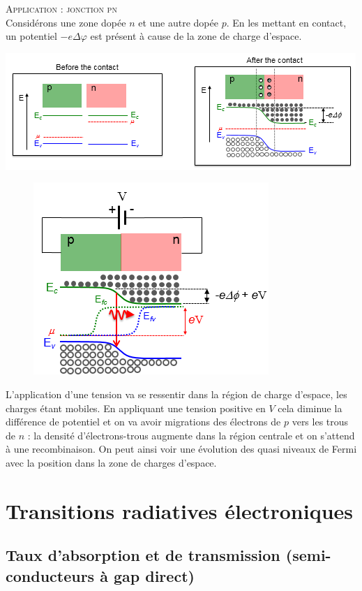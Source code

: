 	\textsc{Application : jonction pn}\\
	Considérons une zone dopée $n$ et une autre dopée $p$. En les mettant en contact, un potentiel
	$-e\Delta\varphi$ est présent à cause de la zone de charge d'espace.
	\begin{center}
	\includegraphics[scale=0.75]{ch5/image15}
	\end{center}
	\newpage
	\begin{figure}
	\vspace{-5mm}
	\includegraphics[scale=0.5]{ch5/image16}
	\end{figure}
	L'application d'une tension va se ressentir dans la région de charge d'espace, les charges étant
	mobiles. En appliquant une tension positive en $V$ cela diminue la différence de potentiel et on 
	va avoir migrations des électrons de $p$ vers les trous de $n$ : la densité d'électrons-trous 
	augmente dans la région centrale et on s'attend à une recombinaison. On peut ainsi voir une 
	évolution des quasi niveaux de Fermi avec la position dans la zone de charges d'espace.
	
	
\section{Transitions radiatives électroniques}
	\subsection{Taux d'absorption et de transmission (semi-conducteurs à gap direct)}
